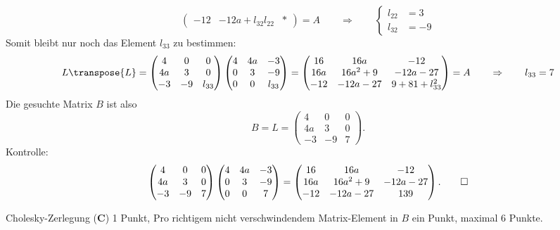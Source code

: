 \begin{loesung}
\[\begin{pmatrix}
-12&-12a+l_{32}l_{22}&         *
\end{pmatrix}
=
A
\qquad\Rightarrow\qquad
\left\{
\begin{aligned}
l_{22}&=3\\
l_{32}&=-9
\end{aligned}
\right.
\]
Somit bleibt nur noch das Element $l_{33}$ zu bestimmen:
\[
L\transpose{L}=
\begin{pmatrix}
4&     0&0\\
4a&3&0\\
-3&-9&l_{33}
\end{pmatrix}
\begin{pmatrix}
4&    4a&    -3\\
0&3&-9\\
0&     0&l_{33}
\end{pmatrix}
=
\begin{pmatrix}
16&16a           &          -12\\
16a&16a^2+9  &-12a-27\\
-12&-12a-27&  9+81+l_{33}^2
\end{pmatrix}
=
A
\qquad\Rightarrow\qquad
l_{33}=7
\]
Die gesuchte Matrix $B$ ist also
\[
B = L=
\begin{pmatrix}
4&     0&0\\
4a&3&0\\
-3&-9&7
\end{pmatrix}.
\]
Kontrolle:
\[
\begin{pmatrix}
4&     0&0\\
4a&3&0\\
-3&-9&7
\end{pmatrix}
\begin{pmatrix}
4&    4a&    -3\\
0&3&-9\\
0&     0&7
\end{pmatrix}
=
\begin{pmatrix}
16& 16a&-12\\
16a&16a^2+9&-12a-27\\
-12& -12a-27&139
\end{pmatrix}.
\qedhere
\]
\end{loesung}

\begin{bewertung}
Cholesky-Zerlegung ({\bf C}) 1 Punkt,
Pro richtigem nicht verschwindendem Matrix-Element in $B$ ein Punkt,
maximal 6 Punkte.
\end{bewertung}


